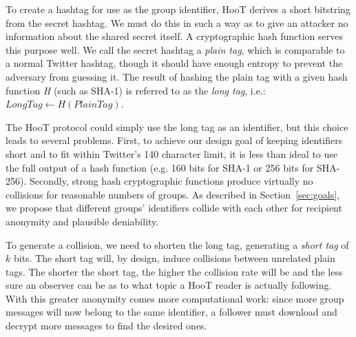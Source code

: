  To create a hashtag for use as the group
identifier, HooT derives a short bitstring from the secret hashtag. We
must do this in such a way as to give an attacker no information about
the shared secret itself. A cryptographic hash function serves this
purpose well.
We call the secret hashtag a \textit{plain tag}, which is comparable to
a normal Twitter hashtag, though it should have enough entropy to
prevent the adversary from guessing it. The result of hashing the plain
tag with a given hash function \textit{H} (such as SHA-1) is referred to
as the \textit{long tag}, i.e.:
%
$\mathit{LongTag} \leftarrow H\left(\mathit{PlainTag}\right)$.

The HooT protocol could simply use the long tag as an identifier, but
this choice leads to several problems. First, to achieve our design goal
of keeping identifiers short and to fit within Twitter's 140 character
limit, it is less than ideal to use the full output of a hash function
(e.g. 160 bits for SHA-1 or 256 bits for SHA-256). Secondly, strong hash
cryptographic functions produce virtually no collisions for reasonable
numbers of groups. As described in Section~\ref{sec:goals}, we propose
that different groups' identifiers collide with each other for recipient
anonymity and plausible deniability.


To generate a collision, we need to shorten the long tag, generating a
\textit{short tag} of $k$ bits. The short tag will, by design, induce
collisions between unrelated plain tags. The shorter the short tag, the
higher the collision rate will be and the less sure an observer can be
as to what topic a HooT reader is actually following. With this greater
anonymity comes more computational work: since more group messages will
now belong to the same identifier, a follower must download and decrypt
more messages to find the desired ones.

